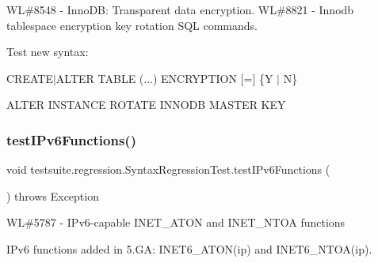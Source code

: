 WL\#8548 -\/ Inno\+DB\+: Transparent data encryption. WL\#8821 -\/ Innodb tablespace encryption key rotation S\+QL commands.

Test new syntax\+:
\begin{DoxyItemize}
\item C\+R\+E\+A\+T\+E$\vert$\+A\+L\+T\+ER T\+A\+B\+LE (...) E\+N\+C\+R\+Y\+P\+T\+I\+ON \mbox{[}=\mbox{]} \{\textquotesingle{}Y\textquotesingle{} $\vert$ \textquotesingle{}N\textquotesingle{}\}
\item A\+L\+T\+ER I\+N\+S\+T\+A\+N\+CE R\+O\+T\+A\+TE I\+N\+N\+O\+DB M\+A\+S\+T\+ER K\+EY 
\end{DoxyItemize}\mbox{\label{classtestsuite_1_1regression_1_1_syntax_regression_test_af681c26981536cc82b5c316136ec34ea}} 
\subsubsection{\texorpdfstring{test\+I\+Pv6\+Functions()}{testIPv6Functions()}}
{\footnotesize\ttfamily void testsuite.\+regression.\+Syntax\+Regression\+Test.\+test\+I\+Pv6\+Functions (\begin{DoxyParamCaption}{ }\end{DoxyParamCaption}) throws Exception}

WL\#5787 -\/ I\+Pv6-\/capable I\+N\+E\+T\+\_\+\+A\+T\+ON and I\+N\+E\+T\+\_\+\+N\+T\+OA functions

I\+Pv6 functions added in 5.\+GA\+: I\+N\+E\+T6\+\_\+\+A\+T\+O\+N(ip) and I\+N\+E\+T6\+\_\+\+N\+T\+O\+A(ip).


